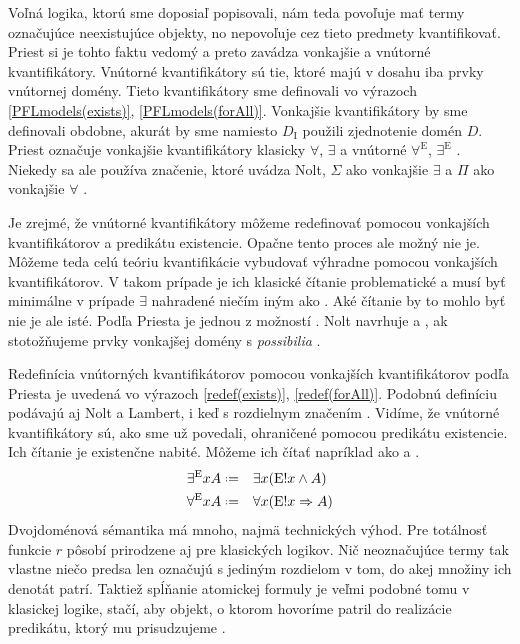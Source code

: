 \documentclass[12pt, letterpaper]{article}
\newcommand*{\defeq}{\mathrel{\vcenter{\baselineskip0.5ex \lineskiplimit0pt
                     \hbox{\scriptsize.}\hbox{\scriptsize.}}}%
                     =}
\begin{document}
Voľná logika, ktorú sme doposiaľ popisovali, nám teda povoľuje mať termy označujúce neexistujúce objekty, no nepovoľuje cez tieto predmety kvantifikovať. Priest si je tohto faktu vedomý a preto zavádza vonkajšie a vnútorné kvantifikátory. Vnútorné kvantifikátory sú tie, ktoré majú v dosahu iba prvky vnútornej domény. Tieto kvantifikátory sme definovali vo výrazoch \ref{PFLmodels(exists)}, \ref{PFLmodels(forAll)}. Vonkajšie kvantifikátory by sme definovali obdobne, akurát by sme namiesto $D_{\text{I}}$ použili zjednotenie domén $D$. Priest označuje vonkajšie kvantifikátory klasicky $\forall$, $\exists$ a vnútorné $\forall^{\text{E}}$, $\exists^{\text{E}}$ \parencites[295]{Priest_2008}. Niekedy sa ale používa značenie, ktoré uvádza Nolt, $\Sigma$ ako vonkajšie $\exists$ a $\Pi$ ako vonkajšie $\forall$ \parencites[]{sep-logic-free}.\par
Je zrejmé, že vnútorné kvantifikátory môžeme redefinovať pomocou vonkajších kvantifikátorov a predikátu existencie. Opačne tento proces ale možný nie je. Môžeme teda celú teóriu kvantifikácie vybudovať výhradne pomocou vonkajších kvantifikátorov. V takom prípade je ich klasické čítanie problematické a musí byť minimálne v prípade $\exists$ nahradené niečím iným ako . Aké čítanie by to mohlo byť nie je ale isté. Podľa Priesta je jednou z možností  \parencites[295--296]{Priest_2008}. Nolt navrhuje  a , ak stotožňujeme prvky vonkajšej domény s \textit{possibilia} \parencites[]{sep-logic-free}.\par
Redefinícia vnútorných kvantifikátorov pomocou vonkajších kvantifikátorov podľa Priesta je uvedená vo výrazoch \ref{redef(exists)}, \ref{redef(forAll)}. Podobnú definíciu podávajú aj Nolt a Lambert, i keď s rozdielnym značením \parencites[82--83]{LambertHierarchy}[]{sep-logic-free}. Vidíme, že vnútorné kvantifikátory sú, ako sme už povedali, ohraničené pomocou predikátu existencie. Ich čítanie je existenčne nabité. Môžeme ich čítať napríklad ako  a .
\begin{alignat}{3}
      \exists^{\text{E}}xA &\defeq&& \exists x (\text{E}!x \land A) \label{redef(exists)}\\
	 \forall^{\text{E}}xA &\defeq&& \forall x (\text{E}!x \Rightarrow A) \label{redef(forAll)}
\end{alignat}
\noindent Dvojdoménová sémantika má mnoho, najmä technických výhod. Pre totálnosť funkcie $r$ pôsobí prirodzene aj pre klasických logikov. Nič neoznačujúce termy tak vlastne niečo predsa len označujú s jediným rozdielom v tom, do akej množiny ich denotát patrí. Taktiež spĺňanie atomickej formuly je veľmi podobné tomu v klasickej logike, stačí, aby objekt, o ktorom hovoríme patril do realizácie predikátu, ktorý mu prisudzujeme \parencites[167]{Bencivenga2002}.\par 
\end{document}
